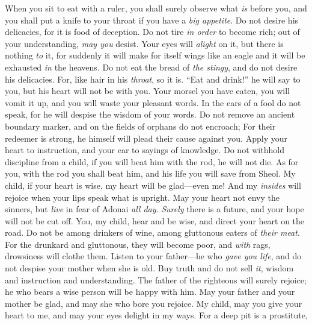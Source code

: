 \begin{biblechapter} %
\verse When you sit to eat with a ruler, 
you shall surely observe what \textit{is} before you,
\verse and you shall put a knife to your throat 
if you have a \textit{big appetite}.
\verse Do not desire his delicacies, 
for it is food of deception.
\verse Do not tire \textit{in order} to become rich; 
out of your understanding, \textit{may you} desist.
\verse Your eyes will \textit{alight} on it, but there is nothing \textit{to} it, 
for suddenly it will make for itself wings 
like an eagle and it will be exhausted \textit{in} the heavens.
\verse Do not eat the bread of \textit{the stingy}, 
and do not desire his delicacies.
\verse For, like hair in his \textit{throat}, so it is. 
“Eat and drink!” he will say to you, 
but his heart will not be with you.
\verse Your morsel you have eaten, you will vomit it up, 
and you will waste your pleasant words.
\verse In the ears of a fool do not speak, 
for he will despise the wisdom of your words.
\verse Do not remove an ancient boundary marker, 
and on the fields of orphans do not encroach;
\verse For their redeemer is strong, 
he himself will plead their cause against you.
\verse Apply your heart to instruction, 
and your ear to sayings of knowledge.
\verse Do not withhold discipline from a child, 
if you will beat him with the rod, he will not die.
\verse As for you, with the rod you shall beat him, 
and his life you will save from Sheol.
\verse My child, if your heart is wise, 
my heart will be glad—even me!
\verse And my \textit{insides} will rejoice 
when your lips speak what is upright.
\verse May your heart not envy the sinners, 
but \textit{live} in fear of Adonai \textit{all day}.
\verse \textit{Surely} there is a future, 
and your hope will not be cut off.
\verse You, my child, hear and be wise, 
and direct your heart on the road.
\verse Do not be among drinkers of wine, 
among gluttonous eaters of \textit{their meat}.
\verse For the drunkard and gluttonous, they will become poor, 
and \textit{with} rags, drowsiness will clothe them.
\verse Listen to your father—he who \textit{gave you life}, 
and do not despise your mother when she is old.
\verse Buy truth and do not sell \textit{it}, 
wisdom and instruction and understanding.
\verse The father of the righteous will surely rejoice; 
he who bears a wise person will be happy with him.
\verse May your father and your mother be glad, 
and may she who bore you rejoice.
\verse My child, may you give your heart to me, 
and may your eyes delight in my ways.
\verse For a deep pit is a prostitute, 

\end{biblechapter}
